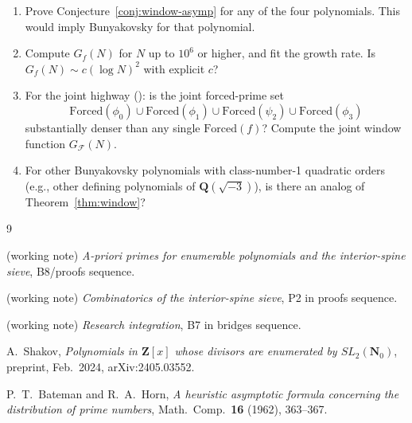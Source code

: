 \documentclass[11pt]{article}
\theoremstyle{definition}
\newcommand{\N}{\mathbf{N}}
\newcommand{\Z}{\mathbf{Z}}
\newcommand{\Q}{\mathbf{Q}}
\newcommand{\F}{\mathcal{F}}
\newcommand{\Forced}{\mathrm{Forced}}
\begin{document}
\begin{enumerate}
\item Prove Conjecture~\ref{conj:window-asymp} for any of the four polynomials. This would imply Bunyakovsky for that polynomial.

\item Compute $G_f(N)$ for $N$ up to $10^6$ or higher, and fit the growth rate. Is $G_f(N) \sim c(\log N)^2$ with explicit $c$?

\item For the joint highway (\cite{B7}): is the joint forced-prime set
\[
\Forced(\phi_0) \cup \Forced(\phi_1) \cup \Forced(\psi_2) \cup \Forced(\phi_3)
\]
substantially denser than any single $\Forced(f)$? Compute the joint window function $G_{\F}(N)$.

\item For other Bunyakovsky polynomials with class-number-1 quadratic orders (e.g., other defining polynomials of $\Q(\sqrt{-3})$), is there an analog of Theorem~\ref{thm:window}?
\end{enumerate}

\begin{thebibliography}{9}

 (working note) \emph{A-priori primes for enumerable polynomials and the interior-spine sieve}, B8/proofs sequence.

 (working note) \emph{Combinatorics of the interior-spine sieve}, P2 in proofs sequence.

 (working note) \emph{Research integration}, B7 in bridges sequence.

 A.\ Shakov, \emph{Polynomials in $\Z[x]$ whose divisors are enumerated by $SL_2(\N_0)$}, preprint, Feb.\ 2024, arXiv:2405.03552.

 P.\ T.\ Bateman and R.\ A.\ Horn, \emph{A heuristic asymptotic formula concerning the distribution of prime numbers}, Math.\ Comp.\ \textbf{16} (1962), 363--367.

\end{thebibliography}
\end{document}
